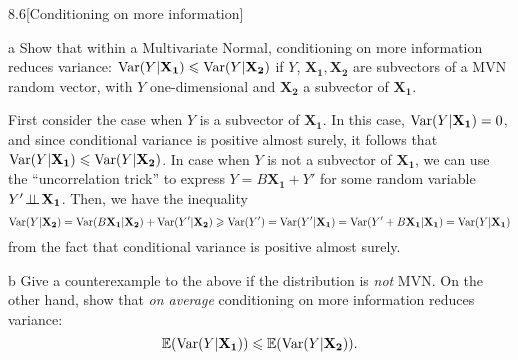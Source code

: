 \documentclass{pset}
\begin{document}
\begin{problem}{8.6}[Conditioning on more information]
\end{problem}

\begin{parts}
  \begin{part}{a} Show that within a Multivariate Normal, conditioning on more information reduces variance: $\textrm{Var}(Y|\mathbf{X_1}) \leqslant \textrm{Var}(Y|\mathbf{X_2})$ if $Y$, $\mathbf{X_1}, \mathbf{X_2}$ are subvectors of a MVN random vector, with $Y$ one-dimensional and $\mathbf{X_2}$ a subvector of $\mathbf{X_1}$.
  \end{part}

  First consider the case when $Y$ is a subvector of $\mathbf{X_1}$. In this case, $\textrm{Var}(Y|\mathbf{X_1})=0$, and since conditional variance is positive almost surely, it follows that $\textrm{Var}(Y|\mathbf{X_1})\leqslant \textrm{Var}(Y|\mathbf{X_2})$. In case when $Y$ is not a subvector of $\mathbf{X_1}$, we can use the ``uncorrelation trick'' to express $Y=B\mathbf{X_1}+Y'$ for some random variable $Y'\!\perp\!\!\!\perp\! \mathbf{X_1}$. Then, we have the inequality
  \[\textrm{Var}(Y|\mathbf{X_2}) = \textrm{Var}(B\mathbf{X_1}|\mathbf{X_2}) + \textrm{Var}(Y'|\mathbf{X_2}) \geqslant \textrm{Var}(Y') = \textrm{Var}(Y'|\mathbf{X_1})=\textrm{Var}(Y'+B\mathbf{X_1}|\mathbf{X_1}) = \textrm{Var}(Y|\mathbf{X_1})\]
  from the fact that conditional variance is positive almost surely.

  \begin{part}{b}
    Give a counterexample to the above if the distribution is \emph{not} MVN. On the other hand, show that \emph{on average} conditioning on more information reduces variance:
    \[\mathbb{E}(\textrm{Var}(Y|\mathbf{X_1})) \leqslant \mathbb{E}(\textrm{Var}(Y|\mathbf{X_2})).\]
  \end{part}


\end{parts}
\end{document}
